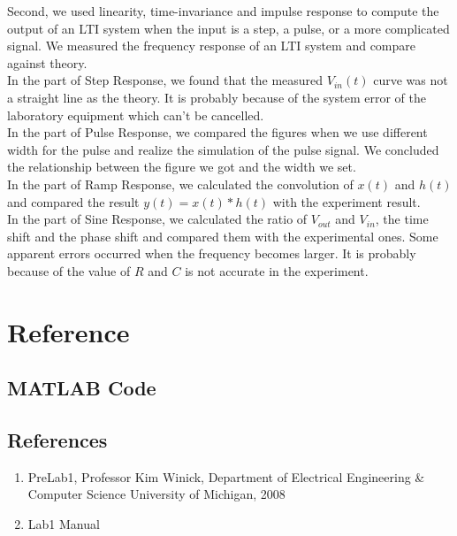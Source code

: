 \documentclass{article}
\begin{document}
Second, we used linearity, time-invariance and impulse response to compute the output of an LTI system when the input is a step, a pulse, or a more complicated signal. We measured the frequency response of an LTI system and compare against theory.\\

In the part of Step Response, we found that the measured $V_{in}(t)$ curve was not a straight line as the theory. It is probably because of the system error of the laboratory equipment which can't be cancelled. \\

In the part of Pulse Response, we compared the figures when we use different width for the pulse and realize the simulation of the pulse signal. We concluded the relationship between the figure we got and the width we set.\\

In the part of Ramp Response, we calculated the convolution of $x(t)$ and $h(t)$ and compared the result $y(t)=x(t)*h(t)$ with the experiment result.\\

In the part of Sine Response, we calculated the ratio of $V_{out}$ and $V_{in}$, the time shift and the phase shift and compared them with the experimental ones. Some apparent errors occurred when the frequency becomes larger. It is probably because of the value of $R$ and $C$ is not accurate in the experiment.

\section{Reference}

\subsection{MATLAB Code}
\begin{minipage}{0.02\linewidth}
\phantom{1}
\end{minipage}
\begin{minipage}{0.9\linewidth}
	
\end{minipage}

\subsection{References}
\begin{enumerate}
	\item PreLab1, Professor Kim Winick, Department of Electrical Engineering \& Computer Science University of Michigan, 2008
	\item Lab1 Manual
\end{enumerate}
\end{document}
